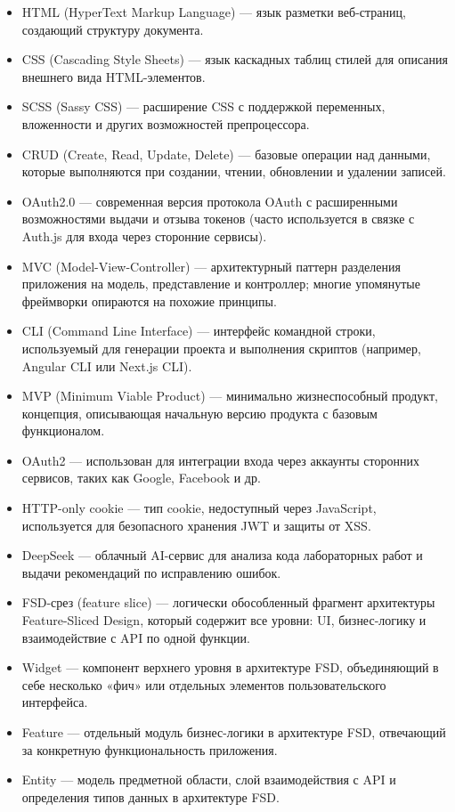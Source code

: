 \begin{itemize}
  \item HTML (HyperText Markup Language) — язык разметки веб-страниц, создающий структуру документа.
  \item CSS (Cascading Style Sheets) — язык каскадных таблиц стилей для описания внешнего вида HTML-элементов.
  \item SCSS (Sassy CSS) — расширение CSS с поддержкой переменных, вложенности и других возможностей препроцессора.
  \item CRUD (Create, Read, Update, Delete) — базовые операции над данными, которые выполняются при создании, чтении, обновлении и удалении записей.
  \item OAuth2.0 — современная версия протокола OAuth с расширенными возможностями выдачи и отзыва токенов (часто используется в связке с Auth.js для входа через сторонние сервисы).
  \item MVC (Model-View-Controller) — архитектурный паттерн разделения приложения на модель, представление и контроллер; многие упомянутые фреймворки опираются на похожие принципы.
  \item CLI (Command Line Interface) — интерфейс командной строки, используемый для генерации проекта и выполнения скриптов (например, Angular CLI или Next.js CLI).
  \item MVP (Minimum Viable Product) — минимально жизнеспособный продукт, концепция, описывающая начальную версию продукта с базовым функционалом.
  \item OAuth2 — использован для интеграции входа через аккаунты сторонних сервисов, таких как Google, Facebook и др.
  \item HTTP-only cookie — тип cookie, недоступный через JavaScript, используется для безопасного хранения JWT и защиты от XSS.
  \item DeepSeek — облачный AI-сервис для анализа кода лабораторных работ и выдачи рекомендаций по исправлению ошибок.
  \item FSD-срез (feature slice) — логически обособленный фрагмент архитектуры Feature-Sliced Design, который содержит все уровни: UI, бизнес-логику и взаимодействие с API по одной функции.
  \item Widget — компонент верхнего уровня в архитектуре FSD, объединяющий в себе несколько «фич» или отдельных элементов пользовательского интерфейса.
  \item Feature — отдельный модуль бизнес-логики в архитектуре FSD, отвечающий за конкретную функциональность приложения.
  \item Entity — модель предметной области, слой взаимодействия с API и определения типов данных в архитектуре FSD.

\end{itemize}
